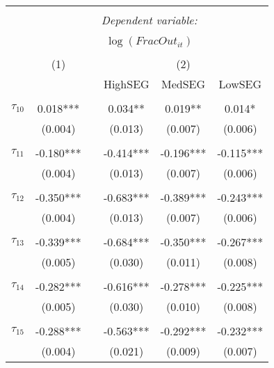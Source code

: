 \begin{tabular}{@{\extracolsep{-0pt}}lccccc} 
\\[-1.8ex]\hline 
\hline \\[-1.8ex] 
 & \multicolumn{5}{c}{\textit{Dependent variable:}} \\ 
\cline{2-6} 
\\[-1.8ex] & \multicolumn{5}{c}{$\log(FracOut_{it})$}\\ 
\\[-1.8ex] & (1) && \multicolumn{3}{c}{(2)} \\ 
\cline{2-2}\cline{4-6}
        &&& HighSEG & MedSEG & LowSEG  \\
 \\[-1.8ex] 
$\tau_{10}$     & 0.018***  &&  0.034**  &  0.019**  &   0.014*  \\
                &  (0.004)  &&  (0.013)  &  (0.007)  &  (0.006)  \\
                &           &&           &           &           \\[-2.1ex]
$\tau_{11}$     & -0.180*** && -0.414*** & -0.196*** & -0.115*** \\
                &  (0.004)  &&  (0.013)  &  (0.007)  &  (0.006)  \\
                &           &&           &           &           \\[-2.1ex]
$\tau_{12}$     & -0.350*** && -0.683*** & -0.389*** & -0.243*** \\
                &  (0.004)  &&  (0.013)  &  (0.007)  &  (0.006)  \\
                &           &&           &           &           \\[-2.1ex]
$\tau_{13}$     & -0.339*** && -0.684*** & -0.350*** & -0.267*** \\
                &  (0.005)  &&  (0.030)  &  (0.011)  &  (0.008)  \\
                &           &&           &           &           \\[-2.1ex]
$\tau_{14}$     & -0.282*** && -0.616*** & -0.278*** & -0.225*** \\
                &  (0.005)  &&  (0.030)  &  (0.010)  &  (0.008)  \\
                &           &&           &           &           \\[-2.1ex]
$\tau_{15}$     & -0.288*** && -0.563*** & -0.292*** & -0.232*** \\
                &  (0.004)  &&  (0.021)  &  (0.009)  &  (0.007)  \\

\end{tabular}
